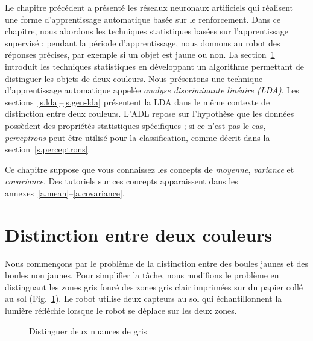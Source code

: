 Le chapitre précédent a présenté les réseaux neuronaux artificiels qui réalisent une forme d'apprentissage automatique basée sur le renforcement. Dans ce chapitre, nous abordons les techniques statistiques basées sur l'apprentissage supervisé : pendant la période d'apprentissage, nous donnons au robot des réponses précises, par exemple si un objet est jaune ou non. La section~\ref{s.sorting-onesensor} introduit les techniques statistiques en développant un algorithme permettant de distinguer les objets de deux couleurs. Nous présentons une technique d'apprentissage automatique appelée \emph{analyse discriminante linéaire (LDA)}. Les sections~\ref{s.lda}--\ref{s.gen-lda} présentent la LDA dans le même contexte de distinction entre deux couleurs. L'ADL repose sur l'hypothèse que les données possèdent des propriétés statistiques spécifiques ; si ce n'est pas le cas, \emph{perceptrons} peut être utilisé pour la classification, comme décrit dans la section~\ref{s.perceptrons}.

Ce chapitre suppose que vous connaissez les concepts de \emph{moyenne}, \emph{variance} et \emph{covariance}. Des tutoriels sur ces concepts apparaissent dans les annexes~\ref{a.mean}--\ref{a.covariance}.

\section{Distinction entre deux couleurs}\label{s.sorting-onesensor}

Nous commençons par le problème de la distinction entre des boules jaunes et des boules non jaunes. Pour simplifier la tâche, nous modifions le problème en distinguant les zones gris foncé des zones gris clair imprimées sur du papier collé au sol (Fig.~\ref{fig.closegrays1}). Le robot utilise deux capteurs au sol qui échantillonnent la lumière réfléchie lorsque le robot se déplace sur les deux zones.

\begin{figure}
\begin{center}
\caption{Distinguer deux nuances de gris}\label{fig.closegrays1}
\end{center}
\end{figure}


